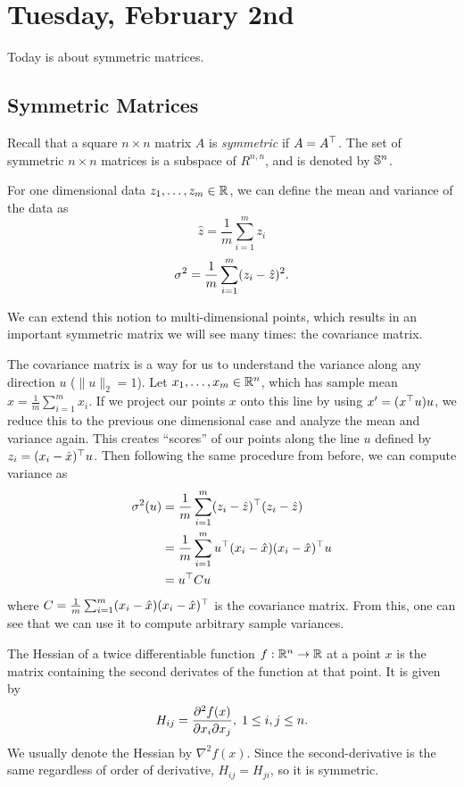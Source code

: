 \documentclass[11 pt]{scrartcl}
\begin{document}
\newpage
\section{Tuesday, February 2nd}

Today is about symmetric matrices. 
\subsection{Symmetric Matrices} 
Recall that a square $n\times n$ matrix $A$ is \emph{symmetric} if $A = A^\top$. 
The set of symmetric $n\times n$ matrices is a subspace of $R^{n,n}$, and is denoted by $\mathbb S^n$. 

\begin{example}
    \label{ex:cov}
    For one dimensional data $z_1, \dots, z_m\in \mathbb R$, we can define the mean and variance of the data as 
    \[ \hat{z} = \frac{1}{m} \sum_{i=1}^m z_i \] 
    \[ \sigma^2 = \frac{1}{m} \sum_{i=1}^m (z_i-\hat{z})^2.\] 
    
    We can extend this notion to multi-dimensional points, which results in an important symmetric matrix we will see many times: the covariance matrix. 
    
    The covariance matrix is a way for us to understand the variance along any direction $u$ ($\|u\|_2=1$). 
    Let $x_1, \dots, x_m \in \mathbb R^n$, which has sample mean $\hat{x} = \frac 1m \sum_{i=1}^m x_i$. 
    If we project our points $x$ onto this line by using $x' = (x^\top u)u$, we reduce this to the previous one dimensional case and analyze the mean and variance again.
    This creates ``scores'' of our points along the line $u$ defined by $z_i = (x_i-\hat{x})^\top u$. 
    Then following the same procedure from before, we can compute variance as 
    \begin{align*}
        \sigma^2(u) &= \frac{1}{m}\sum_{i=1}^m (z_i - \hat{z})^\top (z_i-\hat{z}) \\ 
                 &= \frac{1}{m}\sum_{i=1}^m u^\top (x_i-\hat{x}) (x_i-\hat{x})^\top u  \\ 
                 &= u^\top C u
    \end{align*}
    where $C= \frac{1}{m}\sum_{i=1}^m (x_i-\hat{x}) (x_i-\hat{x})^\top$ is the covariance matrix.
    From this, one can see that we can use it to compute arbitrary sample variances.
\end{example}

\begin{example}
    The Hessian of a twice differentiable function $f: \mathbb R^n \to \mathbb R$ at a point $x$ is the matrix containing the second derivates of the function at that point. 
    It is given by 
    \[ H_{ij} = \dfrac{\partial^2 f(x)}{\partial x_i \partial x_j}, \; 1\leq i,j\leq n.\] 
    We usually denote the Hessian by $\nabla^2 f(x)$. 
    Since the second-derivative is the same regardless of order of derivative, $H_{ij} = H_{ji}$, so it is symmetric. 
\end{example}
\end{document}

